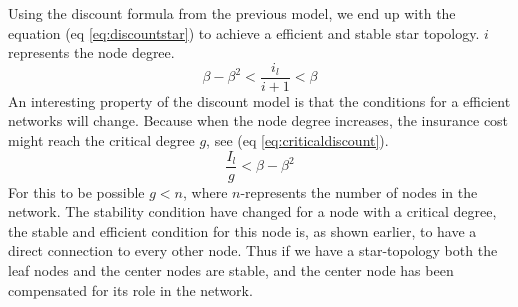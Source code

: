Using the discount formula from the previous model, we end up with the equation (eq \ref{eq:discountstar}) to achieve a efficient and stable star topology. $i$ represents the node degree.
\begin{equation}
\beta-\beta^2<\frac{i_{l}}{i+1}< \beta
\label{eq:discountstar}
\end{equation}
An interesting property of the discount model is that the conditions for a efficient networks will change. Because
when the node degree increases, the insurance cost might reach the critical degree $g$, see (eq \ref{eq:criticaldiscount}). 
\begin{equation}
\frac{I_{l}}{g}<\beta-\beta^2
\label{eq:criticaldiscount}
\end{equation}
For this to be possible $g<n$, where $n$-represents the number of nodes in the network.
The stability condition have changed for a node with a critical degree, the stable and efficient condition for this node is, as shown earlier, to have a direct connection to every other node. Thus if we have a star-topology both the leaf nodes and the center nodes are stable, and the center node has been compensated for its role in the network.


